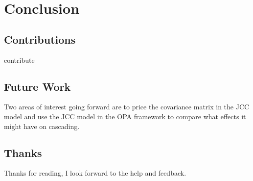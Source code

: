 
\chapter{Conclusion}
\section{Contributions}
contribute 

\section{Future Work}
Two areas of interest going forward are to price the covariance matrix in the JCC model and use the JCC model in the OPA framework to compare what effects it might have on cascading.  

\section*{Thanks}
Thanks for reading, I look forward to the help and feedback.


	
		

\theendnotes
